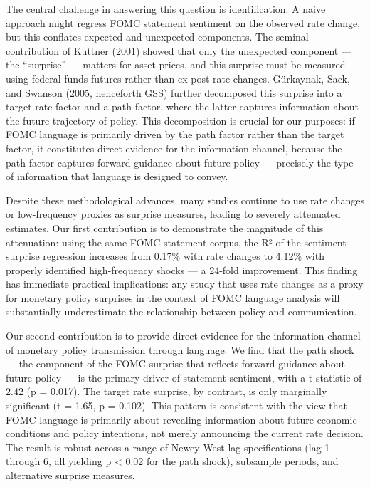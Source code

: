 \documentclass[12pt]{article}
\begin{document}
The central challenge in answering this question is identification. A
naive approach might regress FOMC statement sentiment on the observed
rate change, but this conflates expected and unexpected components. The
seminal contribution of Kuttner (2001) showed that only the unexpected
component --- the ``surprise'' --- matters for asset prices, and this
surprise must be measured using federal funds futures rather than
ex-post rate changes. Gürkaynak, Sack, and Swanson (2005, henceforth
GSS) further decomposed this surprise into a target rate factor and a
path factor, where the latter captures information about the future
trajectory of policy. This decomposition is crucial for our purposes: if
FOMC language is primarily driven by the path factor rather than the
target factor, it constitutes direct evidence for the information
channel, because the path factor captures forward guidance about future
policy --- precisely the type of information that language is designed
to convey.

Despite these methodological advances, many studies continue to use rate
changes or low-frequency proxies as surprise measures, leading to
severely attenuated estimates. Our first contribution is to demonstrate
the magnitude of this attenuation: using the same FOMC statement corpus,
the R² of the sentiment-surprise regression increases from 0.17\% with
rate changes to 4.12\% with properly identified high-frequency shocks
--- a 24-fold improvement. This finding has immediate practical
implications: any study that uses rate changes as a proxy for monetary
policy surprises in the context of FOMC language analysis will
substantially underestimate the relationship between policy and
communication.

Our second contribution is to provide direct evidence for the
information channel of monetary policy transmission through language. We
find that the path shock --- the component of the FOMC surprise that
reflects forward guidance about future policy --- is the primary driver
of statement sentiment, with a t-statistic of 2.42 (p = 0.017). The
target rate surprise, by contrast, is only marginally significant (t =
1.65, p = 0.102). This pattern is consistent with the view that FOMC
language is primarily about revealing information about future economic
conditions and policy intentions, not merely announcing the current rate
decision. The result is robust across a range of Newey-West lag
specifications (lag 1 through 6, all yielding p \textless{} 0.02 for the
path shock), subsample periods, and alternative surprise measures.
\end{document}

